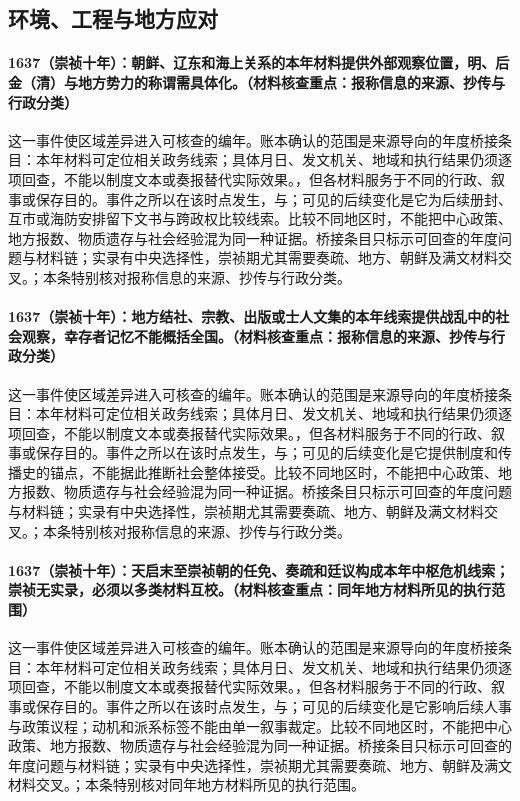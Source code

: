 \subsection{环境、工程与地方应对}

\paragraph{1637（崇祯十年）：朝鲜、辽东和海上关系的本年材料提供外部观察位置，明、后金（清）与地方势力的称谓需具体化。（材料核查重点：报称信息的来源、抄传与行政分类）} 这一事件使区域差异进入可核查的编年。账本确认的范围是来源导向的年度桥接条目：本年材料可定位相关政务线索；具体月日、发文机关、地域和执行结果仍须逐项回查，不能以制度文本或奏报替代实际效果。，但各材料服务于不同的行政、叙事或保存目的。事件之所以在该时点发生，与；可见的后续变化是它为后续册封、互市或海防安排留下文书与跨政权比较线索。比较不同地区时，不能把中心政策、地方报数、物质遗存与社会经验混为同一种证据。桥接条目只标示可回查的年度问题与材料链；实录有中央选择性，崇祯期尤其需要奏疏、地方、朝鲜及满文材料交叉。；本条特别核对报称信息的来源、抄传与行政分类。

\paragraph{1637（崇祯十年）：地方结社、宗教、出版或士人文集的本年线索提供战乱中的社会观察，幸存者记忆不能概括全国。（材料核查重点：报称信息的来源、抄传与行政分类）} 这一事件使区域差异进入可核查的编年。账本确认的范围是来源导向的年度桥接条目：本年材料可定位相关政务线索；具体月日、发文机关、地域和执行结果仍须逐项回查，不能以制度文本或奏报替代实际效果。，但各材料服务于不同的行政、叙事或保存目的。事件之所以在该时点发生，与；可见的后续变化是它提供制度和传播史的锚点，不能据此推断社会整体接受。比较不同地区时，不能把中心政策、地方报数、物质遗存与社会经验混为同一种证据。桥接条目只标示可回查的年度问题与材料链；实录有中央选择性，崇祯期尤其需要奏疏、地方、朝鲜及满文材料交叉。；本条特别核对报称信息的来源、抄传与行政分类。

\paragraph{1637（崇祯十年）：天启末至崇祯朝的任免、奏疏和廷议构成本年中枢危机线索；崇祯无实录，必须以多类材料互校。（材料核查重点：同年地方材料所见的执行范围）} 这一事件使区域差异进入可核查的编年。账本确认的范围是来源导向的年度桥接条目：本年材料可定位相关政务线索；具体月日、发文机关、地域和执行结果仍须逐项回查，不能以制度文本或奏报替代实际效果。，但各材料服务于不同的行政、叙事或保存目的。事件之所以在该时点发生，与；可见的后续变化是它影响后续人事与政策议程；动机和派系标签不能由单一叙事裁定。比较不同地区时，不能把中心政策、地方报数、物质遗存与社会经验混为同一种证据。桥接条目只标示可回查的年度问题与材料链；实录有中央选择性，崇祯期尤其需要奏疏、地方、朝鲜及满文材料交叉。；本条特别核对同年地方材料所见的执行范围。

